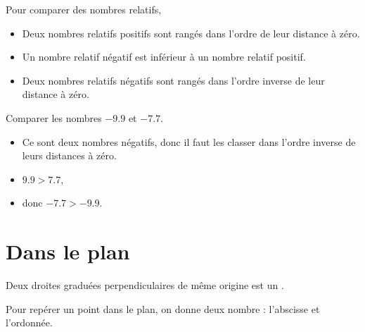 

\begin{Aretenir}
    
    Pour comparer des nombres relatifs,

    \begin{itemize}
        \item 
Deux nombres relatifs positifs sont rangés dans l'ordre de leur distance à zéro.  
\item
Un nombre relatif négatif est inférieur à un nombre relatif positif. 
\item
Deux nombres relatifs négatifs sont rangés dans l'ordre inverse de leur distance à zéro.
    \end{itemize}
\end{Aretenir}

\begin{example}
    Comparer les nombres \( -9.9\) et \( -7.7\).
    \begin{itemize}
        \item Ce sont deux nombres négatifs, donc il faut les classer dans l'ordre inverse de leurs distances à zéro.
        \item \( 9.9 > 7.7\),
        \item donc \( -7.7 > -9.9\).
    \end{itemize}
\end{example}

\section{Dans le plan}



\begin{definition}
    Deux droites graduées perpendiculaires de même origine est un . 
\end{definition}

\begin{Aretenir}
    Pour repérer un point dans le plan, on donne deux nombre : l'abscisse et l'ordonnée.
\end{Aretenir}

